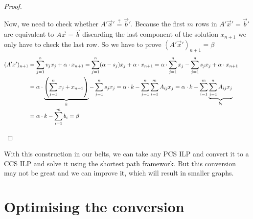 \begin{proof}
\begin{itemize}
        Now, we need to check whether $A'\vec x'\stackrel{?}{=}\vec b'$. Because the first $m$ rows in $A'\vec x'=\vec b'$ are equivalent to $A\vec x=\vec b$ discarding the last component of the solution $x_{n+1}$ we only have to check the last row. So we have to prove $(A'\vec x')_{n+1} = \beta$
        \begin{align*}
            (A'x')_{n+1} &= \sum_{j=1}^{n}v_jx_j + \alpha \cdot x_{n+1} = \sum_{j=1}^{n}(\alpha - s_j)x_j + \alpha \cdot x_{n+1} = \alpha \cdot \sum_{j=1}^{n}x_j - \sum_{j=1}^{n}s_jx_j + \alpha \cdot x_{n+1}\\
            &= \alpha \cdot \underbrace{\left(\sum_{j=1}^{n}x_j + x_{n+1}\right)}_k - \sum_{j=1}^{n}s_jx_j = \alpha \cdot k - \sum_{j=1}^{n}\sum_{i=1}^{m}A_{ij}x_j = \alpha\cdot k - \sum_{i=1}^{m}\underbrace{\sum_{j=1}^{n}A_{ij}x_j}_{b_i}\\
            &= \alpha\cdot k - \sum_{i=1}^{m}b_i = \beta &&\qedhere
        \end{align*}
    \end{itemize}
\end{proof}
With this construction in our belts, we can take any PCS ILP and convert it to a CCS ILP and solve it using the shortest path framework. But this conversion may not be great and we can improve it, which will result in smaller graphs.

\section{Optimising the conversion}
